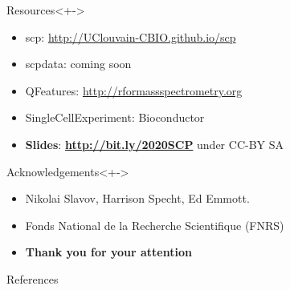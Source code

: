 \documentclass{beamer}
\newcommand{\hcode}[2][lgray]{{\ttfamily\color{vdgray}\colorbox{#1}{#2}}}
\begin{document}
\begin{frame}

  \begin{block}{Resources}<+->
    \begin{itemize}
        \item \hcode{scp}: \url{http://UClouvain-CBIO.github.io/scp}
        \item \hcode{scpdata}: coming soon
        \item \hcode{QFeatures}: \url{http://rformassspectrometry.org}
        \item \hcode{SingleCellExperiment}: Bioconductor
        \item \textbf{Slides}: \textbf{\url{http://bit.ly/2020SCP}} under CC-BY SA
    \end{itemize}
  \end{block}

  \bigskip

  \begin{block}{Acknowledgements}<+->
    \begin{itemize}
    \item Nikolai Slavov, Harrison Specht, Ed Emmott.
    \item Fonds National de la Recherche Scientifique (FNRS)
    \item \textbf{Thank you for your attention}
    \end{itemize}
  \end{block}
  
\end{frame}



\begin{frame}[allowframebreaks]{References}
  \scriptsize
  
  
\end{frame}
\end{document}
